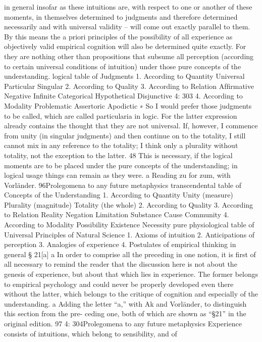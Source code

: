 in general insofar as these intuitions are, with respect to one or another
of these moments, in themselves determined to judgments and therefore
determined necessarily and with universal validity – will come out exactly
parallel to them. By this means the a priori principles of the possibility
of all experience as objectively valid empirical cognition will also be
determined quite exactly. For they are nothing other than propositions
that subsume all perception (according to certain universal conditions of
intuition) under those pure concepts of the understanding.
logical table
of Judgments
1.
According to Quantity
Universal
Particular
Singular
2.
According to Quality 3.
According to Relation
Afﬁrmative
Negative
Inﬁnite Categorical
Hypothetical
Disjunctive
4: 303
4.
According to Modality
Problematic
Assertoric
Apodictic
∗ So I would prefer those judgments to be called, which are called particularia in
logic. For the latter expression already contains the thought that they are not
universal. If, however, I commence from unity (in singular judgments) and then
continue on to the totality, I still cannot mix in any reference to the totality; I
think only a plurality without totality, not the exception to the latter. 48 This is
necessary, if the logical moments are to be placed under the pure concepts of
the understanding; in logical usage things can remain as they were.
a Reading zu for zum, with Vorländer.
96Prolegomena to any future metaphysics
transcendental table
of Concepts of the Understanding
1.
According to Quantity
Unity (measure)
Plurality (magnitude)
Totality (the whole)
2.
According to Quality 3.
According to Relation
Reality
Negation
Limitation Substance
Cause
Community
4.
According to Modality
Possibility
Existence
Necessity
pure physiological table
of Universal Principles of Natural Science
1.
Axioms
of intuition
2.
Anticipations
of perception
3.
Analogies
of experience
4.
Postulates
of empirical thinking in general
§ 21[a] a
In order to comprise all the preceding in one notion, it is ﬁrst of all
necessary to remind the reader that the discussion here is not about
the genesis of experience, but about that which lies in experience. The
former belongs to empirical psychology and could never be properly
developed even there without the latter, which belongs to the critique of
cognition and especially of the understanding.
a
Adding the letter “a,” with Ak and Vorländer, to distinguish this section from the pre-
ceding one, both of which are shown as “§21” in the original edition.
97
4: 304Prolegomena to any future metaphysics
Experience consists of intuitions, which belong to sensibility, and of
